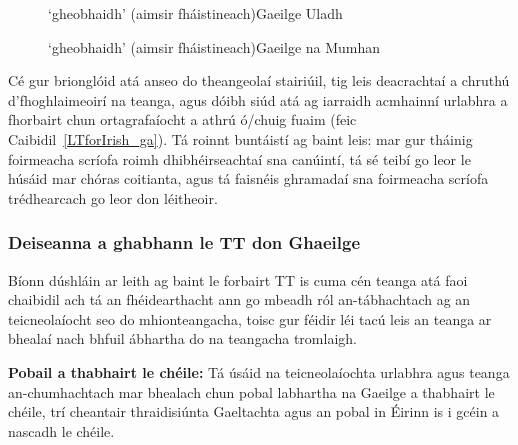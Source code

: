 \begin{multicols}{2}
\begin{description}
\item [{\rm \begin{IPA}j\super jo: i\end{IPA}}]  `gheobhaidh’  (aimsir fháistineach)\newline Gaeilge Uladh
\item [{\rm \begin{IPA}g\super jo: g\super j\end{IPA}} ]  `gheobhaidh’  (aimsir fháistineach)\newline Gaeilge na Mumhan
\end{description}

Cé gur brionglóid atá anseo do theangeolaí stairiúil, tig leis deacrachtaí a chruthú d’fhoghlaimeoirí na teanga, agus dóibh siúd atá ag iarraidh acmhainní urlabhra a fhorbairt chun ortagrafaíocht a athrú ó/chuig fuaim (feic Caibidil~\ref{LTforIrish_ga}).  Tá roinnt buntáistí ag baint leis: mar gur tháinig foirmeacha scríofa roimh dhibhéirseachtaí sna canúintí, tá sé teibí go leor le húsáid mar chóras coitianta, agus tá faisnéis ghramadaí sna foirmeacha scríofa trédhearcach go leor don léitheoir.

\subsubsection{Deiseanna a ghabhann le TT don Ghaeilge}

Bíonn dúshláin ar leith ag baint le forbairt TT is cuma cén teanga atá faoi chaibidil ach tá an fhéidearthacht ann go mbeadh ról an-tábhachtach ag an teicneolaíocht seo do mhionteangacha, toisc gur féidir léi tacú leis an teanga ar bhealaí nach bhfuil ábhartha do na teangacha tromlaigh.

\textbf{Pobail a thabhairt le chéile:} Tá úsáid na teicneolaíochta urlabhra agus teanga an-chumhachtach mar bhealach chun pobal labhartha na Gaeilge a thabhairt le chéile, trí cheantair thraidisiúnta Gaeltachta agus an pobal in Éirinn is i gcéin a nascadh le chéile.


\end{multicols}
